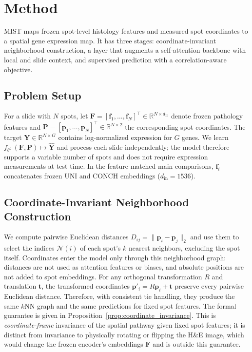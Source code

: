 \documentclass[11pt]{article}
\begin{document}
\section{Method}

MIST maps frozen spot-level histology features and measured spot coordinates to a spatial gene
expression map. It has three stages: coordinate-invariant neighborhood construction, a layer that
augments a self-attention backbone with local and slide context, and supervised prediction
with a correlation-aware objective.

\subsection{Problem Setup}
For a slide with $N$ spots, let
$\mathbf{F}=[\mathbf{f}_1,\ldots,\mathbf{f}_N]^\top\in\mathbb{R}^{N\times d_{\mathrm{in}}}$
denote frozen pathology features and
$\mathbf{P}=[\mathbf{p}_1,\ldots,\mathbf{p}_N]^\top\in\mathbb{R}^{N\times2}$ the corresponding
spot coordinates. The target
$\mathbf{Y}\in\mathbb{R}^{N\times G}$ contains log-normalized expression for $G$ genes. We learn
$f_\theta:(\mathbf{F},\mathbf{P})\mapsto\hat{\mathbf{Y}}$ and process each slide independently;
the model therefore supports a variable number of spots and does not require expression measurements at
test time. In the feature-matched main comparisons, $\mathbf{f}_i$ concatenates frozen UNI
\cite{chen2024uni} and CONCH \cite{lu2024conch} embeddings ($d_{\mathrm{in}}=1536$).


\subsection{Coordinate-Invariant Neighborhood Construction}
We compute pairwise Euclidean distances $D_{ij}=\lVert\mathbf{p}_i-\mathbf{p}_j\rVert_2$ and use
them to select the indices $\mathcal{N}(i)$ of each spot's $k$ nearest neighbors, excluding the spot
itself. Coordinates enter the model only through this neighborhood graph: distances are not used as
attention features or biases, and absolute positions are not added to spot embeddings. For any
orthogonal transformation $R$ and translation $\mathbf{t}$, the transformed coordinates
$\mathbf{p}'_i=R\mathbf{p}_i+\mathbf{t}$ preserve every pairwise Euclidean distance. Therefore, with
consistent tie handling, they produce the same $k$NN graph and the same predictions for fixed spot
features. The formal guarantee is given in Proposition~\ref{prop:coordinate_invariance}. This is
\emph{coordinate-frame} invariance of the spatial pathway given fixed spot features; it is distinct
from invariance to physically rotating or flipping the H\&E image, which would change the frozen
encoder's embeddings $\mathbf{F}$ and is outside this guarantee.
\end{document}
